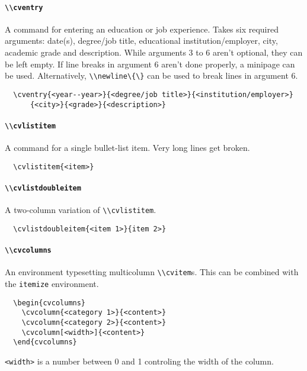 \documentclass[a4paper, 11pt]{article}
\newcommand{\code}[1]{\lstinline!#1!}
\begin{document}
\paragraph{\code{\\cventry}}
A command for entering an education or job experience.
Takes six required arguments: date(s), degree/job title, educational institution/employer, city, academic grade and description.
While arguments 3 to 6 aren't optional, they can be left empty.
If line breaks in argument 6 aren't done properly, a minipage can be used.
Alternatively, \code{\\newline\{\}} can be used to break lines in argument 6.
\begin{lstlisting}
  \cventry{<year--year>}{<degree/job title>}{<institution/employer>}
      {<city>}{<grade>}{<description>}
\end{lstlisting}

\paragraph{\code{\\cvlistitem}}
A command for a single bullet-list item.
Very long lines get broken.
\begin{lstlisting}
  \cvlistitem{<item>}
\end{lstlisting}

\paragraph{\code{\\cvlistdoubleitem}}
A two-column variation of \code{\\cvlistitem}.
\begin{lstlisting}
  \cvlistdoubleitem{<item 1>}{item 2>}
\end{lstlisting}

\paragraph{\code{\\cvcolumns}}
An environment typesetting multicolumn \code{\\cvitem}s.
This can be combined with the \code{itemize} environment.
\begin{lstlisting}
  \begin{cvcolumns}
    \cvcolumn{<category 1>}{<content>}
    \cvcolumn{<category 2>}{<content>}
    \cvcolumn[<width>]{<content>}
  \end{cvcolumns}
\end{lstlisting}
\code{<width>} is a number between 0 and 1 controling the width of the column.
\end{document}
